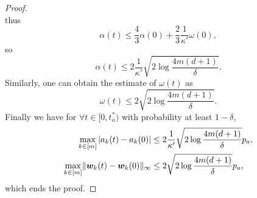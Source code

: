 \documentclass{article}
\begin{document}
\begin{proof}
\begin{equation}
    \end{equation}
    thus
    \begin{equation}
        \alpha(t)\leq\frac{4}{3}\alpha(0)+\frac{2}{3}\frac{1}{\kappa'}\omega(0),
    \end{equation}
    so
    \begin{equation}
        \alpha(t)\leq 2\frac{1}{\kappa'}\sqrt{2\log\frac{4m(d+1)}{\delta}}.
    \end{equation}
    Similarly, one can obtain the estimate of $\omega(t)$ as
    \begin{equation}
        \omega(t)\leq 2\sqrt{2\log\frac{4m(d+1)}{\delta}}.
    \end{equation}
    Finally we have for $\forall t\in[0, t^*_a)$ with probability at least $1-\delta$,
    \begin{equation}
        \begin{aligned}
            \max\limits_{k\in[m]}|a_k(t) - a_k(0)|
             & \leq 2\frac{1}{\kappa'}\sqrt{2\log\frac{4m(d+1)}{\delta}}p_a, \\
            \max\limits_{k\in[m]}\lVert\bm{w}_k(t) - \bm{w}_k(0)\rVert_{\infty}
             & \leq 2\sqrt{2\log\frac{4m(d+1)}{\delta}}p_a,
        \end{aligned}
    \end{equation}
    which ends the proof.
\end{proof}
\end{document}
